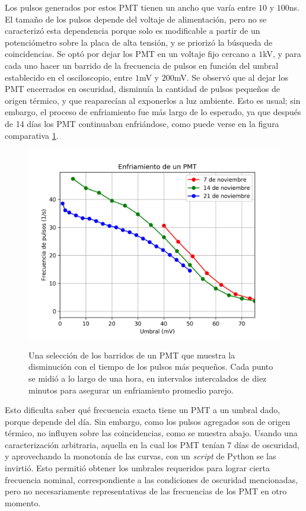 \documentclass[12pt,a4paper]{article}
\numberwithin{equation}{section}
\begin{document}
Los pulsos generados por estos PMT tienen un ancho que varía entre $10$ y $100$ns. El tamaño de los pulsos depende del voltaje de alimentación, pero no se caracterizó esta dependencia porque solo es modificable a partir de un potenciómetro sobre la placa de alta tensión, y se priorizó la búsqueda de coincidencias. Se optó por dejar los PMT en un voltaje fijo cercano a $1$kV, y para cada uno hacer un barrido de la frecuencia de pulsos en función del umbral establecido en el osciloscopio, entre $1$mV y $200$mV. Se observó que al dejar los PMT encerrados en oscuridad, disminuía la cantidad de pulsos pequeños de origen térmico, y que reaparecían al exponerlos a luz ambiente. Esto es usual; sin embargo, el proceso de enfriamiento fue más largo de lo esperado, ya que después de 14 días los PMT continuaban enfriándose, como puede verse en la figura comparativa \ref{fig:tengofrio}.
\begin{figure}[h]
	\centering
	\includegraphics[width=.7\linewidth]{imgs/enfriamiento.jpg}
	\label{fig:tengofrio}
	\caption{Una selección de los barridos de un PMT que muestra la disminución con el tiempo de los pulsos más pequeños. Cada punto se midió a lo largo de una hora, en intervalos intercalados de diez minutos para asegurar un enfriamiento promedio parejo.}
\end{figure}

Esto dificulta saber qué frecuencia exacta tiene un PMT a un umbral dado, porque depende del día. Sin embargo, como los pulsos agregados son de origen térmico, no influyen sobre las coincidencias, como se muestra abajo. Usando una caracterización arbitraria, aquella en la cual los PMT tenían 7 días de oscuridad, y aprovechando la monotonía de las curvas, con un \textit{script} de Python se las invirtió. Esto permitió obtener los umbrales requeridos para lograr cierta frecuencia nominal, correspondiente a las condiciones de oscuridad mencionadas, pero no necesariamente representativas de las frecuencias de los PMT en otro momento. 
\end{document}
